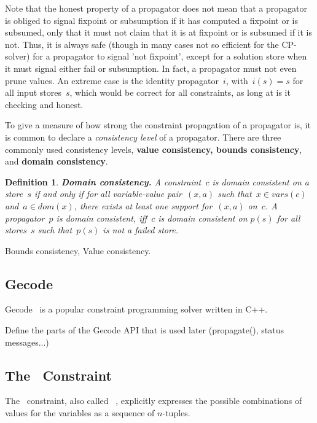\documentclass[a4paper,11pt]{article}
\newtheorem{definition}{Definition}
\newcommand{\Todo}[1]{{\color{blue}#1}}
\newcommand{\Table}{\Constraint{Table}~}
\newcommand{\Extensional}{\Constraint{Extensional}~}
\numberwithin{equation}{section}
\begin{document}
Note that the honest property of a propagator does not mean that a
propagator is obliged to signal fixpoint or subsumption
if it has computed a fixpoint or is subsumed, only that it must not 
claim that it is at fixpoint or is subsumed if it is not. 
Thus, it is always safe 
(though in many cases not so efficient for the CP-solver)
for a propagator to signal 'not fixpoint', except for a solution store
when it must signal either fail or subsumption.
In fact, a propagator must not even prune values. An extreme case is
the identity propagator~$i$, with~$i(s) = s$ for all input stores~$s$,
which would be correct
for all constraints, as long at is it checking and honest.

To give a measure of how strong the constraint propagation of a propagator
is, it is common to declare a \emph{consistency level} of a propagator.
There are three commonly used consistency levels,
\textbf{value consistency, bounds consistency}, and \textbf{domain consistency}.

\begin{definition}
  \textbf{Domain consistency.} A constraint~$c$ is domain consistent on a store~$s$ 
  if and only if for all variable-value
  pair~$(x,a)$ such that~$x \in vars(c)$ and~$a \in dom(x)$, there exists
  at least one support for~$(x,a)$ on~$c$. 
  A propagator~$p$ is domain consistent, iff~$c$ is domain 
  consistent on $p(s)$ for all stores~$s$ such that~$p(s)$ is not a failed store.
\end{definition}

\Todo{Bounds consistency, Value consistency}.

\subsection{Gecode}
\label{bg:gecode}
Gecode~\cite{Gecode} is a popular constraint programming solver written in C++.

\Todo{Define the parts of the Gecode API that is used later (propagate(), status
  messages...)}



\subsection{The \Table Constraint}
\label{bg:table}
The \Table constraint, also called \Extensional,
explicitly expresses the possible combinations of values for the variables as a
sequence of $n$-tuples.
\end{document}
